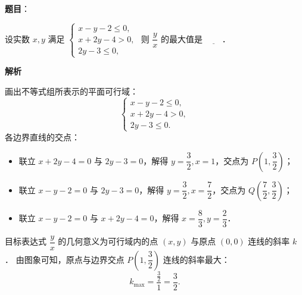 \begin{answer}

\textbf{题目}：

设实数 $x, y$ 满足 $\begin{cases} x - y - 2 \leqslant 0, \\ x + 2y - 4 > 0, \\ 2y - 3 \leqslant 0, \end{cases}$ 则 $\dfrac{y}{x}$ 的最大值是 $\underline{\hspace{2em}}$．

\textbf{解析}

画出不等式组所表示的平面可行域：
\nopagebreak[4]
\[
\begin{cases}
x - y - 2 \leqslant 0, \\
x + 2y - 4 > 0, \\
2y - 3 \leqslant 0.
\end{cases}
\]
各边界直线的交点：
\begin{itemize}
\item 联立 $x + 2y - 4 = 0$ 与 $2y - 3 = 0$，解得 $y = \dfrac{3}{2}, x = 1$，交点为 $P\left(1, \dfrac{3}{2}\right)$；
\item 联立 $x - y - 2 = 0$ 与 $2y - 3 = 0$，解得 $y = \dfrac{3}{2}, x = \dfrac{7}{2}$，交点为 $Q\left(\dfrac{7}{2}, \dfrac{3}{2}\right)$；
\item 联立 $x - y - 2 = 0$ 与 $x + 2y - 4 = 0$，解得 $x = \dfrac{8}{3}, y = \dfrac{2}{3}$．
\end{itemize}

目标表达式 $\dfrac{y}{x}$ 的几何意义为可行域内的点 $(x, y)$ 与原点 $(0, 0)$ 连线的斜率 $k$．
由图象可知，原点与边界交点 $P\left(1, \dfrac{3}{2}\right)$ 连线的斜率最大：
\nopagebreak[4]
\[
k_{\max} = \dfrac{\frac{3}{2}}{1} = \dfrac{3}{2}.
\]


\end{answer}
